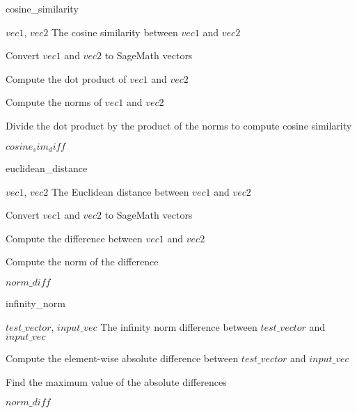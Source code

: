 \documentclass[12pt]{article}
\begin{document}
\begin{algorithm}
    \caption{cosine\_similarity}
    \begin{algorithmic}[1]
        \REQUIRE $vec1$, $vec2$
        \ENSURE The cosine similarity between $vec1$ and $vec2$
    
        \STATE Convert $vec1$ and $vec2$ to SageMath vectors
    
        \STATE Compute the dot product of $vec1$ and $vec2$
    
        \STATE Compute the norms of $vec1$ and $vec2$
    
        \STATE Divide the dot product by the product of the norms to compute cosine similarity
    
        \RETURN $cosine_sim_diff$
    
    \end{algorithmic}
\end{algorithm}
    
\begin{algorithm}
    \caption{euclidean\_distance}
    \begin{algorithmic}[1]
        \REQUIRE $vec1$, $vec2$
        \ENSURE The Euclidean distance between $vec1$ and $vec2$
    
        \STATE Convert $vec1$ and $vec2$ to SageMath vectors
    
        \STATE Compute the difference between $vec1$ and $vec2$
    
        \STATE Compute the norm of the difference
    
        \RETURN $norm\_diff$
    
    \end{algorithmic}
\end{algorithm}

\begin{algorithm}
    \caption{infinity\_norm}
    \begin{algorithmic}[1]
        \REQUIRE $test\_vector$, $input\_vec$
        \ENSURE The infinity norm difference between $test\_vector$ and $input\_vec$
    
        \STATE Compute the element-wise absolute difference between $test\_vector$ and $input\_vec$
    
        \STATE Find the maximum value of the absolute differences
    
        \RETURN $norm\_diff$
    
    \end{algorithmic}
\end{algorithm}
\end{document}
